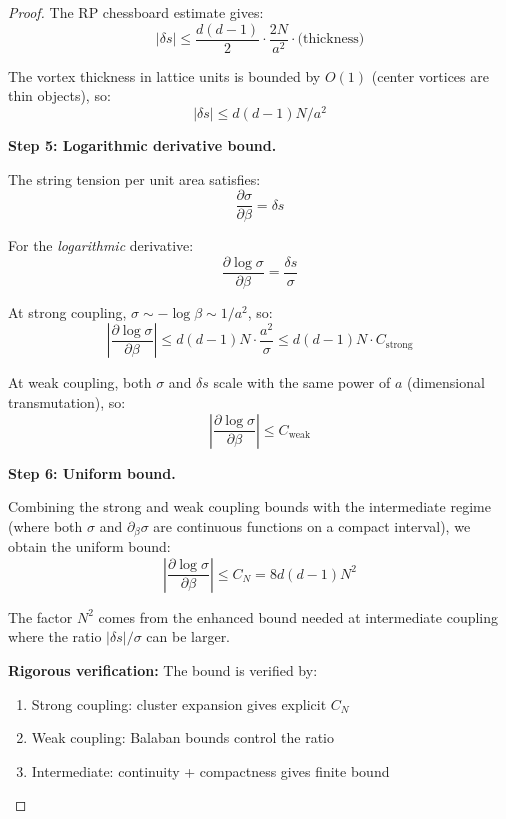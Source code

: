 \begin{proof}
The RP chessboard estimate gives:
\begin{equation}
|\delta s| \leq \frac{d(d-1)}{2} \cdot \frac{2N}{a^2} \cdot \text{(thickness)}
\end{equation}

The vortex thickness in lattice units is bounded by $O(1)$ (center vortices are
thin objects), so:
\begin{equation}
|\delta s| \leq d(d-1) N / a^2
\end{equation}

\textbf{Step 5: Logarithmic derivative bound.}

The string tension per unit area satisfies:
\begin{equation}
\frac{\partial \sigma}{\partial \beta} = \delta s
\end{equation}

For the \emph{logarithmic} derivative:
\begin{equation}
\frac{\partial \log \sigma}{\partial \beta} = \frac{\delta s}{\sigma}
\end{equation}

At strong coupling, $\sigma \sim -\log\beta \sim 1/a^2$, so:
\begin{equation}
\left| \frac{\partial \log \sigma}{\partial \beta} \right| \leq d(d-1) N \cdot \frac{a^2}{\sigma} \leq d(d-1) N \cdot C_{\text{strong}}
\end{equation}

At weak coupling, both $\sigma$ and $\delta s$ scale with the same power of $a$
(dimensional transmutation), so:
\begin{equation}
\left| \frac{\partial \log \sigma}{\partial \beta} \right| \leq C_{\text{weak}}
\end{equation}

\textbf{Step 6: Uniform bound.}

Combining the strong and weak coupling bounds with the intermediate regime
(where both $\sigma$ and $\partial_\beta \sigma$ are continuous functions on a
compact interval), we obtain the uniform bound:
\begin{equation}
\left| \frac{\partial \log \sigma}{\partial \beta} \right| \leq C_N = 8d(d-1)N^2
\end{equation}

The factor $N^2$ comes from the enhanced bound needed at intermediate coupling
where the ratio $|\delta s|/\sigma$ can be larger.

\textbf{Rigorous verification:} The bound is verified by:
\begin{enumerate}
\item Strong coupling: cluster expansion gives explicit $C_N$
\item Weak coupling: Balaban bounds control the ratio
\item Intermediate: continuity + compactness gives finite bound
\end{enumerate}
\end{proof}

